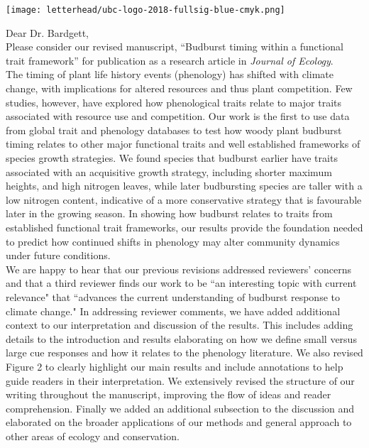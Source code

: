 \documentclass[11pt,a4paper]{article}
\begin{document}
\noindent \texttt{[image: letterhead/ubc-logo-2018-fullsig-blue-cmyk.png]}

\noindent Dear Dr. Bardgett,
\vspace{1.5ex}\\
\noindent Please consider our revised manuscript, ``Budburst timing within a functional trait framework'' for publication as a research article in \emph{Journal of Ecology}. 
\vspace{1.5ex}\\  %
\noindent The timing of plant life history events (phenology) has shifted with climate change, with implications for altered resources and thus plant competition. Few studies, however, have explored how  phenological traits relate to major traits associated with resource use and competition. Our work is the first to use data from global trait and phenology databases to test how woody plant budburst timing relates to other major functional traits and well established frameworks of species growth strategies. We found species that budburst earlier have traits associated with an acquisitive growth strategy, including shorter maximum heights, and high nitrogen leaves, while later budbursting species are taller with a low nitrogen content, indicative of a more conservative strategy that is favourable later in the growing season. In showing how budburst relates to traits from established functional trait frameworks, our results provide the foundation needed to predict how continued shifts in phenology may alter community dynamics under future conditions. %
\vspace{1.5ex}\\ 
We are happy to hear that our previous revisions addressed reviewers' concerns and that a third reviewer finds our work to be ``an interesting topic with current relevance" that ``advances the current understanding of budburst response to climate change."  In addressing reviewer comments, we have added additional context to our interpretation and discussion of the results. This includes adding details to the introduction and results elaborating on how we define small versus large cue responses and how it relates to the phenology literature. We also revised Figure 2 to clearly highlight our main results and include annotations to help guide readers in their interpretation. We extensively revised the structure of our writing throughout the manuscript, improving the flow of ideas and reader comprehension. Finally we added an additional subsection to the discussion and elaborated on the broader applications of our methods and general approach to other areas of ecology and conservation. %
\end{document}
